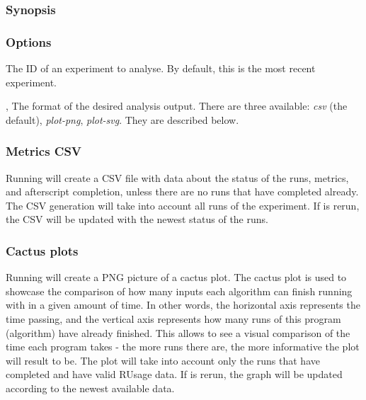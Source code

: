 \documentclass[a4paper,english]{article}
\begin{document}
\begin{adjustwidth}{18pt}{0pt}
            \subsubsection{Synopsis}
                 

            \subsubsection{Options}
                \begin{Description}[Options]
                  \item[\Arg{experiment-id}]
                    The ID of an experiment to analyse.
                    By default, this is the most recent experiment.
                  \item[\OptArg{-o}{ format}, \OptArg{\ddash output}{ format}]
                    The format of the desired analysis output. There are three available:
                    \emph{csv} (the default), \emph{plot-png}, \emph{plot-svg}. They are described below.
                \end{Description}

            \subsubsection{Metrics CSV}
                Running    will create a CSV file with
                data about the status of the runs, metrics, and afterscript completion, unless there
                are no runs that have completed already.
                The CSV generation will take into account all runs of the experiment. If 
                 is rerun, the CSV will be updated with the newest status of the runs.

            \subsubsection{Cactus plots}
                Running    will create a PNG picture of
                a cactus plot.
                The cactus plot is used to showcase the comparison of how many inputs each algorithm
                can finish running with in a given amount of time.
                In other words, the horizontal axis represents the time passing, and the vertical axis
                represents how many runs of this program (algorithm) have already finished.
                This allows to see a visual comparison of the time each program takes - the more runs
                there are, the more informative the plot will result to be.
                The plot will take into account only the runs that have completed and have valid
                RUsage data. If   is rerun, the graph will be updated
                according to the newest available data.


\end{adjustwidth}
\end{document}
